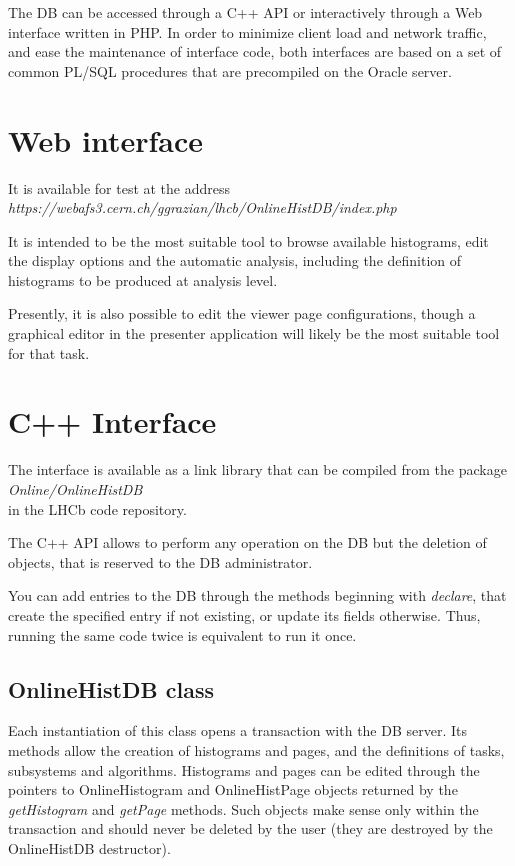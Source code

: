 \documentclass{lhcbnote}
\begin{document}
The DB can be accessed through a C++ API or interactively through a
Web interface written in PHP. In order to minimize client load and
network traffic, and ease the maintenance of interface code, both
interfaces  are based on a set of common PL/SQL procedures that are
precompiled on the Oracle server.

\section{Web interface}

It is available for test at the address\\
{\it https://webafs3.cern.ch/ggrazian/lhcb/OnlineHistDB/index.php}

It is intended to be the most suitable tool to browse available
histograms, edit the display options and the automatic analysis, including
the definition of histograms to be produced at analysis level.

Presently, it is also possible to edit the viewer page configurations, though
a graphical editor in the presenter application will likely be the
most suitable tool for that task.

\section{C++ Interface}

The interface is available as a link library that can be compiled from
the package \\
{\it Online/OnlineHistDB} \\
in the LHCb code repository.

The C++ API allows to perform any operation on the DB but the deletion
of objects, that is reserved to the DB administrator.

You can add entries to the DB through the methods beginning with {\it
declare}, that create the specified entry if not existing, or 
update its fields otherwise. Thus, running the same code twice is
equivalent to run it once.


\subsection{OnlineHistDB class}
Each instantiation of this class opens a transaction with the DB
server. Its methods allow the creation of histograms and pages, and
the definitions of tasks, subsystems and algorithms. Histograms and
pages can be edited through the pointers to OnlineHistogram and
OnlineHistPage objects returned by the {\it getHistogram} and {\it
getPage} methods. Such objects make sense only within the transaction
and should never be deleted by the user (they are destroyed by the
OnlineHistDB destructor). 
\end{document}
